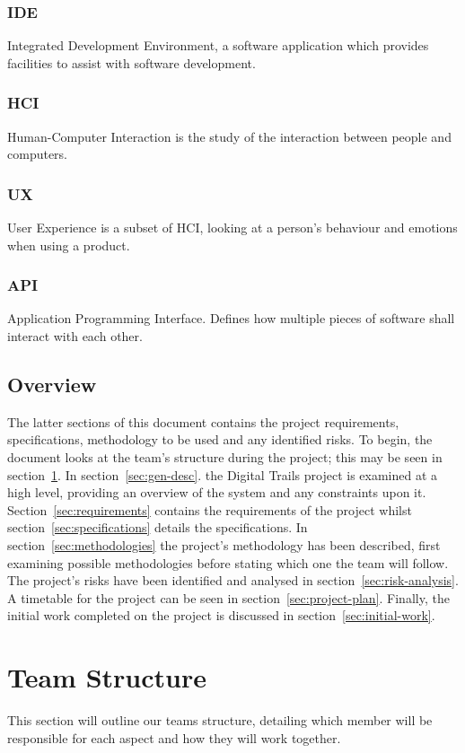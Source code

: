 \documentclass[11pt,a4paper]{article}
\begin{document}
\subsubsection{IDE}
Integrated Development Environment, a software application which provides facilities to assist with software development.

\subsubsection{HCI}
Human-Computer Interaction is the study of the interaction between people and computers.

\subsubsection{UX}
User Experience is a subset of HCI, looking at a person's behaviour and emotions when using a product.

\subsubsection{API}
Application Programming Interface. Defines how multiple pieces of software shall interact with each other.

\subsection{Overview}
The latter sections of this document contains the project requirements, specifications, methodology to be used and any identified risks. To begin, the document looks at the team's structure during the project; this may be seen in section~\ref{sec:team-structure}. In section~\ref{sec:gen-desc}. the Digital Trails project is examined at a high level, providing an overview of the system and any constraints upon it. Section~\ref{sec:requirements} contains the requirements of the project whilst section~\ref{sec:specifications} details the specifications. In section~\ref{sec:methodologies} the project's methodology has been described, first examining possible methodologies before stating which one the team will follow. The project's risks have been identified and analysed in section~\ref{sec:risk-analysis}. A timetable for the project can be seen in section~\ref{sec:project-plan}. Finally, the initial work completed on the project is discussed in section~\ref{sec:initial-work}.

\section{Team Structure}
\label{sec:team-structure}
This section will outline our teams structure, detailing which member will be responsible for each aspect and how they will work together. 
\end{document}
